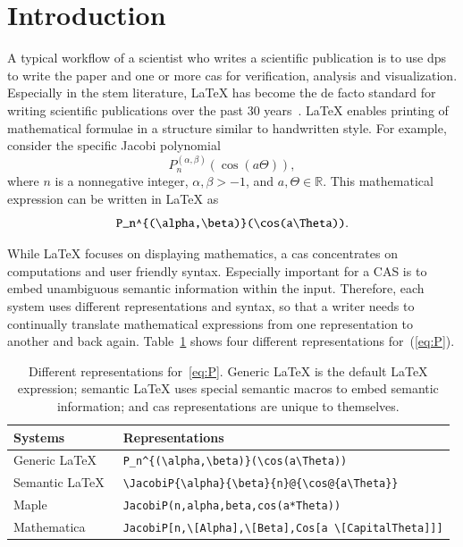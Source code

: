 \documentclass[a4paper,11pt]{article}
\newcommand{\Maple}{Maple}
\newcommand{\Mathematica}{Mathematica}
\theoremstyle{defTheoStyle}
\theoremstyle{defExampStyle}
\DeclareRobustCommand{\Real}{\mathbb{R}}
\begin{document}
\section{Introduction}
A typical workflow of a scientist who writes a scientific publication is to use \gls*{dps} to write the paper and one or more \gls*{cas} for verification, analysis and visualization. Especially in the \gls*{stem} literature, \LaTeX{}
has become the de facto standard for writing scientific publications over the past 30 years~\parencites{Knuth}[559]{DigitalTypo}{LATEX:Standard}. \LaTeX{} enables printing of mathematical formulae in a structure similar to handwritten style. For example, consider the specific Jacobi polynomial~\parencite[Table 18.3.1]{NIST:DLMF}
\begin{equation}\label{eq:P}
P_n^{(\alpha , \beta)}(\cos(a\Theta)),
\end{equation}
where $n$ is a nonnegative integer, $\alpha, \beta > -1$, and $a,\Theta\in \Real$.
This mathematical expression can be written in \LaTeX{} as
\begin{equation*}
\verb|P_n^{(\alpha,\beta)}(\cos(a\Theta))|.
\end{equation*}

While \LaTeX{} focuses on displaying mathematics, a \gls*{cas} concentrates on computations and user friendly syntax. Especially important for a CAS is to embed unambiguous semantic information within the input. Therefore, each system uses different representations and syntax, so that a writer needs to continually translate mathematical expressions from one representation to another and back again. Table~\ref{tab:JacobiP-usecase} shows four different representations for~(\ref{eq:P}).

\begin{table}[ht]
	\centering
	\begin{tabular}{ll}
		\hline
		Systems & Representations \\
		\hline
		\hline
		Generic \LaTeX\ & \verb|P_n^{(\alpha,\beta)}(\cos(a\Theta))| \\ 
		Semantic \LaTeX\ & \verb|\JacobiP{\alpha}{\beta}{n}@{\cos@{a\Theta}}| \\
		\Maple & \verb|JacobiP(n,alpha,beta,cos(a*Theta))| \\ 
		\Mathematica & \verb|JacobiP[n,\[Alpha],\[Beta],Cos[a \[CapitalTheta]]]|\\
		\hline
	\end{tabular}
	\caption{Different representations for~\eqref{eq:P}. Generic \LaTeX{} is the default \LaTeX{} expression; semantic \LaTeX{} uses special semantic macros to embed semantic information; and \gls*{cas} representations are unique to themselves.}
	\label{tab:JacobiP-usecase}
\end{table}
\end{document}

